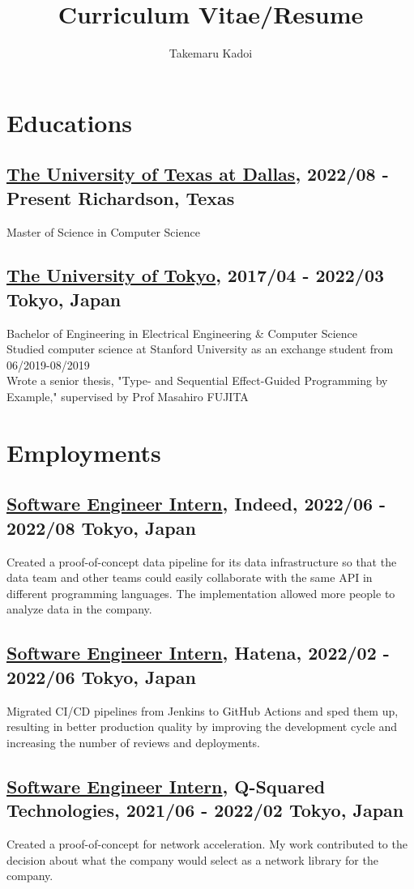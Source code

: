 \documentclass[10pt]{article}
\title{\vspace{-1cm}Curriculum Vitae/Resume}
\author{Takemaru Kadoi}
\date{}
\begin{document}
\section*{Educations}
  \subsection*{\underline{The University of Texas at Dallas}, 2022/08 - Present \hfill Richardson, Texas}
    Master of Science in Computer Science
  \subsection*{\underline{The University of Tokyo}, 2017/04 -  2022/03 \hfill Tokyo, Japan}
    Bachelor of Engineering in Electrical Engineering \& Computer Science
    \\
    Studied computer science at Stanford University as an exchange student from 06/2019-08/2019
    \\
    Wrote a senior thesis, "Type- and Sequential Effect-Guided Programming by Example," supervised by Prof Masahiro FUJITA

\section*{Employments}
  \subsection*{\underline{Software Engineer Intern}, Indeed, 2022/06 - 2022/08 \hfill Tokyo, Japan}
    Created a proof-of-concept data pipeline for its data infrastructure so that the data team and other teams could easily collaborate with the same API in different programming languages.
    The implementation allowed more people to analyze data in the company.
  \subsection*{\underline{Software Engineer Intern}, Hatena, 2022/02 - 2022/06 \hfill Tokyo, Japan}
    Migrated CI/CD pipelines from Jenkins to GitHub Actions and sped them up, resulting in better production quality by improving the development cycle and increasing the number of reviews and deployments.
  \subsection*{\underline{Software Engineer Intern}, Q-Squared Technologies, 2021/06 - 2022/02 \hfill Tokyo, Japan}
    Created a proof-of-concept for network acceleration.
    My work contributed to the decision about what the company would select as a network library for the company.
\end{document}
